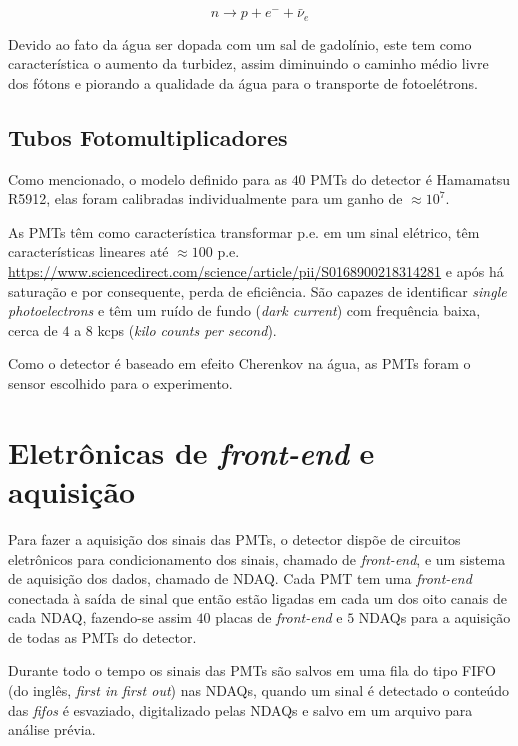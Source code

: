 \begin{equation}
n \rightarrow p + e^- + \bar{\nu}_e 
\end{equation}

Devido ao fato da água ser dopada com um sal de gadolínio, este tem como característica o aumento da turbidez, assim diminuindo o caminho médio livre dos fótons e piorando a qualidade da água para o transporte de fotoelétrons.

\subsection{Tubos Fotomultiplicadores} \label{subsec:pmt}

Como mencionado, o modelo definido para as $40$ PMTs do detector é Hamamatsu R5912, elas foram calibradas individualmente para um ganho de $\approx10^7$.

As PMTs têm como característica transformar  \ac{p.e.} em um sinal elétrico, têm características lineares até $\approx 100$ p.e. \url{https://www.sciencedirect.com/science/article/pii/S0168900218314281} e após há saturação e por consequente, perda de eficiência. São capazes de identificar \emph{single photoelectrons} e têm um ruído de fundo (\emph{dark current}) com frequência baixa, cerca de $4$ a $8$ kcps (\emph{kilo counts per second}). 

Como o detector é baseado em efeito Cherenkov na água, as PMTs foram o sensor escolhido para o experimento.


\section{Eletrônicas de \emph{front-end} e aquisição}

Para fazer a aquisição dos sinais das PMTs, o detector dispõe de circuitos eletrônicos para condicionamento dos sinais, chamado de \emph{front-end}, e um sistema de aquisição dos dados, chamado de \ac{NDAQ}. Cada PMT tem uma \emph{front-end} conectada à saída de sinal que então estão ligadas em cada um dos oito canais de cada NDAQ, fazendo-se assim $40$ placas de \emph{front-end} e $5$ NDAQs para a aquisição de todas as PMTs do detector.

Durante todo o tempo os sinais das PMTs são salvos em uma fila do tipo FIFO (do inglês, \emph{first in first out}) nas NDAQs, quando um sinal é detectado o conteúdo das \emph{fifos} é esvaziado, digitalizado pelas NDAQs e salvo em um arquivo para análise prévia.

